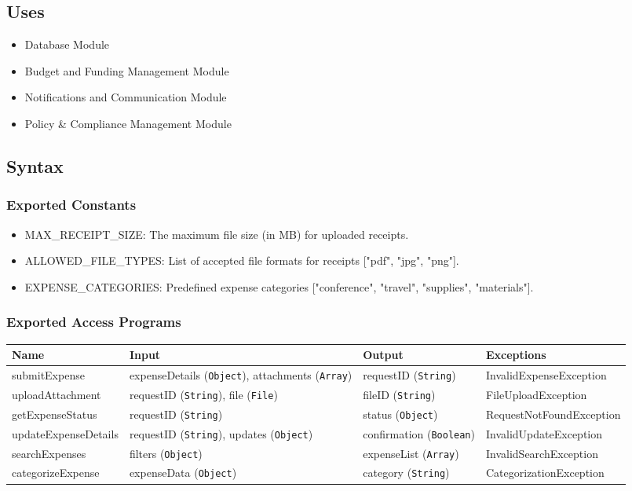 \documentclass[12pt, titlepage]{article}
\begin{document}
\subsection{Uses}
\begin{itemize}
    \item Database Module
    \item Budget and Funding Management Module
    \item Notifications and Communication Module
    \item Policy \& Compliance Management Module
\end{itemize}

\subsection{Syntax}
\subsubsection{Exported Constants}
\begin{itemize}
    \item MAX\_RECEIPT\_SIZE: The maximum file size (in MB) for uploaded receipts.
    \item ALLOWED\_FILE\_TYPES: List of accepted file formats for receipts ["pdf", "jpg", "png"].
    \item EXPENSE\_CATEGORIES: Predefined expense categories ["conference", "travel", "supplies", "materials"].
\end{itemize}

\subsubsection{Exported Access Programs}
\begin{center}
    \scriptsize
    \begin{tabular}{|p{3cm}|p{4cm}|p{4cm}|p{4cm}|}
        \hline
        \textbf{Name} & \textbf{Input} & \textbf{Output} & \textbf{Exceptions} \\
        \hline
        submitExpense & expenseDetails (\texttt{Object}), attachments (\texttt{Array}) & requestID (\texttt{String}) & InvalidExpenseException \\
        \hline
        uploadAttachment & requestID (\texttt{String}), file (\texttt{File}) & fileID (\texttt{String}) & FileUploadException \\
        \hline
        getExpenseStatus & requestID (\texttt{String}) & status (\texttt{Object}) & RequestNotFoundException \\
        \hline
        updateExpenseDetails & requestID (\texttt{String}), updates (\texttt{Object}) & confirmation (\texttt{Boolean}) & InvalidUpdateException \\
        \hline
        searchExpenses & filters (\texttt{Object}) & expenseList (\texttt{Array}) & InvalidSearchException \\
        \hline
        categorizeExpense & expenseData (\texttt{Object}) & category (\texttt{String}) & CategorizationException \\
        \hline
    \end{tabular}
\end{center}
\end{document}
